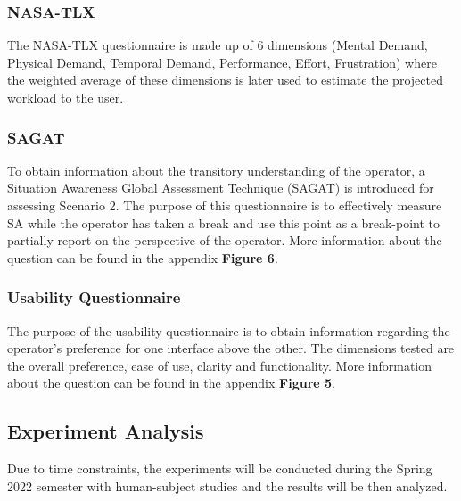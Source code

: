 \documentclass[conference]{IEEEtran}
\begin{document}
\subsubsection{NASA-TLX} 
The NASA-TLX questionnaire is made up of 6 dimensions (Mental Demand, Physical Demand, Temporal Demand, Performance, Effort, Frustration)  \cite{b26} where the weighted average of these dimensions is later used to estimate the projected workload to the user. 

\subsubsection{SAGAT} 
To obtain information about the transitory understanding of the operator, a Situation Awareness Global Assessment Technique (SAGAT) is introduced for assessing Scenario 2. The purpose of this questionnaire is to effectively measure SA while the operator has taken a break and use this point as a break-point to partially report on the perspective of the operator. \cite{b27} More information about the question can be found in the appendix \textbf{Figure 6}.

\subsubsection{Usability Questionnaire}
The purpose of the usability questionnaire is to obtain information regarding the operator's preference for one interface above the other. The dimensions tested are the overall preference, ease of use, clarity and functionality. More information about the question can be found in the appendix \textbf{Figure 5}.

\subsection{Experiment Analysis}
Due to time constraints, the experiments will be conducted during the Spring 2022 semester with human-subject studies and the results will be then analyzed. 
\end{document}

